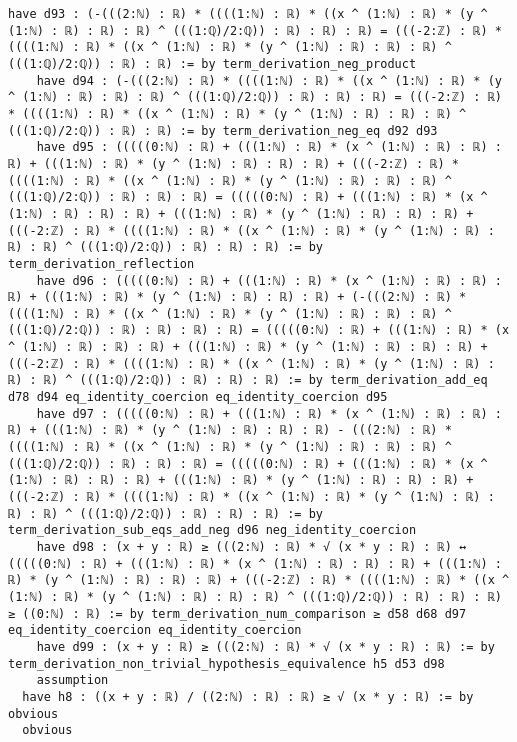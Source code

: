 \documentclass{article}
\begin{document}
\begin{tcolorbox}[colback=white!10, width=\linewidth]
\begin{lstlisting}[language=Lean4]
    have d93 : (-(((2:ℕ) : ℝ) * ((((1:ℕ) : ℝ) * ((x ^ (1:ℕ) : ℝ) * (y ^ (1:ℕ) : ℝ) : ℝ) : ℝ) ^ (((1:ℚ)/2:ℚ)) : ℝ) : ℝ) : ℝ) = (((-2:ℤ) : ℝ) * ((((1:ℕ) : ℝ) * ((x ^ (1:ℕ) : ℝ) * (y ^ (1:ℕ) : ℝ) : ℝ) : ℝ) ^ (((1:ℚ)/2:ℚ)) : ℝ) : ℝ) := by term_derivation_neg_product
    have d94 : (-(((2:ℕ) : ℝ) * ((((1:ℕ) : ℝ) * ((x ^ (1:ℕ) : ℝ) * (y ^ (1:ℕ) : ℝ) : ℝ) : ℝ) ^ (((1:ℚ)/2:ℚ)) : ℝ) : ℝ) : ℝ) = (((-2:ℤ) : ℝ) * ((((1:ℕ) : ℝ) * ((x ^ (1:ℕ) : ℝ) * (y ^ (1:ℕ) : ℝ) : ℝ) : ℝ) ^ (((1:ℚ)/2:ℚ)) : ℝ) : ℝ) := by term_derivation_neg_eq d92 d93
    have d95 : (((((0:ℕ) : ℝ) + (((1:ℕ) : ℝ) * (x ^ (1:ℕ) : ℝ) : ℝ) : ℝ) + (((1:ℕ) : ℝ) * (y ^ (1:ℕ) : ℝ) : ℝ) : ℝ) + (((-2:ℤ) : ℝ) * ((((1:ℕ) : ℝ) * ((x ^ (1:ℕ) : ℝ) * (y ^ (1:ℕ) : ℝ) : ℝ) : ℝ) ^ (((1:ℚ)/2:ℚ)) : ℝ) : ℝ) : ℝ) = (((((0:ℕ) : ℝ) + (((1:ℕ) : ℝ) * (x ^ (1:ℕ) : ℝ) : ℝ) : ℝ) + (((1:ℕ) : ℝ) * (y ^ (1:ℕ) : ℝ) : ℝ) : ℝ) + (((-2:ℤ) : ℝ) * ((((1:ℕ) : ℝ) * ((x ^ (1:ℕ) : ℝ) * (y ^ (1:ℕ) : ℝ) : ℝ) : ℝ) ^ (((1:ℚ)/2:ℚ)) : ℝ) : ℝ) : ℝ) := by term_derivation_reflection
    have d96 : (((((0:ℕ) : ℝ) + (((1:ℕ) : ℝ) * (x ^ (1:ℕ) : ℝ) : ℝ) : ℝ) + (((1:ℕ) : ℝ) * (y ^ (1:ℕ) : ℝ) : ℝ) : ℝ) + (-(((2:ℕ) : ℝ) * ((((1:ℕ) : ℝ) * ((x ^ (1:ℕ) : ℝ) * (y ^ (1:ℕ) : ℝ) : ℝ) : ℝ) ^ (((1:ℚ)/2:ℚ)) : ℝ) : ℝ) : ℝ) : ℝ) = (((((0:ℕ) : ℝ) + (((1:ℕ) : ℝ) * (x ^ (1:ℕ) : ℝ) : ℝ) : ℝ) + (((1:ℕ) : ℝ) * (y ^ (1:ℕ) : ℝ) : ℝ) : ℝ) + (((-2:ℤ) : ℝ) * ((((1:ℕ) : ℝ) * ((x ^ (1:ℕ) : ℝ) * (y ^ (1:ℕ) : ℝ) : ℝ) : ℝ) ^ (((1:ℚ)/2:ℚ)) : ℝ) : ℝ) : ℝ) := by term_derivation_add_eq d78 d94 eq_identity_coercion eq_identity_coercion d95
    have d97 : (((((0:ℕ) : ℝ) + (((1:ℕ) : ℝ) * (x ^ (1:ℕ) : ℝ) : ℝ) : ℝ) + (((1:ℕ) : ℝ) * (y ^ (1:ℕ) : ℝ) : ℝ) : ℝ) - (((2:ℕ) : ℝ) * ((((1:ℕ) : ℝ) * ((x ^ (1:ℕ) : ℝ) * (y ^ (1:ℕ) : ℝ) : ℝ) : ℝ) ^ (((1:ℚ)/2:ℚ)) : ℝ) : ℝ) : ℝ) = (((((0:ℕ) : ℝ) + (((1:ℕ) : ℝ) * (x ^ (1:ℕ) : ℝ) : ℝ) : ℝ) + (((1:ℕ) : ℝ) * (y ^ (1:ℕ) : ℝ) : ℝ) : ℝ) + (((-2:ℤ) : ℝ) * ((((1:ℕ) : ℝ) * ((x ^ (1:ℕ) : ℝ) * (y ^ (1:ℕ) : ℝ) : ℝ) : ℝ) ^ (((1:ℚ)/2:ℚ)) : ℝ) : ℝ) : ℝ) := by term_derivation_sub_eqs_add_neg d96 neg_identity_coercion
    have d98 : (x + y : ℝ) ≥ (((2:ℕ) : ℝ) * √ (x * y : ℝ) : ℝ) ↔ (((((0:ℕ) : ℝ) + (((1:ℕ) : ℝ) * (x ^ (1:ℕ) : ℝ) : ℝ) : ℝ) + (((1:ℕ) : ℝ) * (y ^ (1:ℕ) : ℝ) : ℝ) : ℝ) + (((-2:ℤ) : ℝ) * ((((1:ℕ) : ℝ) * ((x ^ (1:ℕ) : ℝ) * (y ^ (1:ℕ) : ℝ) : ℝ) : ℝ) ^ (((1:ℚ)/2:ℚ)) : ℝ) : ℝ) : ℝ) ≥ ((0:ℕ) : ℝ) := by term_derivation_num_comparison ≥ d58 d68 d97 eq_identity_coercion eq_identity_coercion
    have d99 : (x + y : ℝ) ≥ (((2:ℕ) : ℝ) * √ (x * y : ℝ) : ℝ) := by term_derivation_non_trivial_hypothesis_equivalence h5 d53 d98
    assumption
  have h8 : ((x + y : ℝ) / ((2:ℕ) : ℝ) : ℝ) ≥ √ (x * y : ℝ) := by obvious
  obvious

\end{lstlisting}
\end{tcolorbox}
\end{document}
